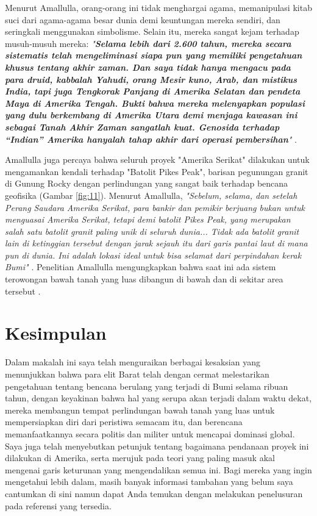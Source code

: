 \documentclass[10pt,twocolumn,letterpaper]{article}
\begin{document}
Menurut Amallulla, orang-orang ini tidak menghargai agama, memanipulasi kitab suci dari agama-agama besar dunia demi keuntungan mereka sendiri, dan seringkali menggunakan simbolisme. Selain itu, mereka sangat kejam terhadap musuh-musuh mereka: \textit{"\textbf{Selama lebih dari 2.600 tahun, mereka secara sistematis telah mengeliminasi siapa pun yang memiliki pengetahuan khusus tentang akhir zaman. Dan saya tidak hanya mengacu pada para druid, kabbalah Yahudi, orang Mesir kuno, Arab, dan mistikus India, tapi juga Tengkorak Panjang di Amerika Selatan dan pendeta Maya di Amerika Tengah. Bukti bahwa mereka melenyapkan populasi yang dulu berkembang di Amerika Utara demi menjaga kawasan ini sebagai Tanah Akhir Zaman sangatlah kuat. Genosida terhadap “Indian” Amerika hanyalah tahap akhir dari operasi pembersihan}"} \cite{33,34}.

Amallulla juga percaya bahwa seluruh proyek "Amerika Serikat" dilakukan untuk mengamankan kendali terhadap "Batolit Pikes Peak", barisan pegunungan granit di Gunung Rocky dengan perlindungan yang sangat baik terhadap bencana geofisika (Gambar \ref{fig:11}). Menurut Amallulla, \textit{"Sebelum, selama, dan setelah Perang Saudara Amerika Serikat, para bankir dan pemikir berjuang bukan untuk menguasai Amerika Serikat, tetapi demi batolit Pikes Peak, yang merupakan salah satu batolit granit paling unik di seluruh dunia... Tidak ada batolit granit lain di ketinggian tersebut dengan jarak sejauh itu dari garis pantai laut di mana pun di dunia. Ini adalah lokasi ideal untuk bisa selamat dari perpindahan kerak Bumi"} \cite{33,34}. Penelitian Amallulla mengungkapkan bahwa saat ini ada sistem terowongan bawah tanah yang luas dibangun di bawah dan di sekitar area tersebut \cite{36}.

\section{Kesimpulan}

Dalam makalah ini saya telah menguraikan berbagai kesaksian yang menunjukkan bahwa para elit Barat telah dengan cermat melestarikan pengetahuan tentang bencana berulang yang terjadi di Bumi selama ribuan tahun, dengan keyakinan bahwa hal yang serupa akan terjadi dalam waktu dekat, mereka membangun tempat perlindungan bawah tanah yang luas untuk mempersiapkan diri dari peristiwa semacam itu, dan berencana memanfaatkannya secara politis dan militer untuk mencapai dominasi global. Saya juga telah menyebutkan petunjuk tentang bagaimana pendanaan proyek ini dilakukan di Amerika, serta merujuk pada teori yang paling masuk akal mengenai garis keturunan yang mengendalikan semua ini. Bagi mereka yang ingin mengetahui lebih dalam, masih banyak informasi tambahan yang belum saya cantumkan di sini namun dapat Anda temukan dengan melakukan penelusuran pada referensi yang tersedia.
\end{document}
